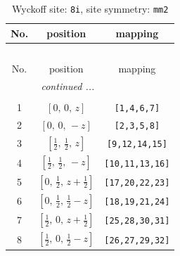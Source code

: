 \documentclass[fleqn,8pt]{jsarticle}
\begin{document}
\begin{longtable}{ccc}
\caption{Wyckoff site: {\tt 8i}, site symmetry: {\tt mm2}}
 \\
 \hline \hline
No. & position & mapping \\ \hline \endfirsthead

\multicolumn{2}{l}{\tablename\ \thetable{}} \\
 \hline \hline
No. & position & mapping \\ \hline \endhead

 \hline \hline
\multicolumn{2}{r}{\footnotesize\it continued ...} \\ \endfoot

 \hline \hline
\multicolumn{2}{r}{} \\ \endlastfoot

1 & $\left[ 0,\, 0,\, z \right]$ & {\tt [1,4,6,7]} \\ \hline
2 & $\left[ 0,\, 0,\, - z \right]$ & {\tt [2,3,5,8]} \\ \hline
3 & $\left[ \frac{1}{2},\, \frac{1}{2},\, z \right]$ & {\tt [9,12,14,15]} \\ \hline
4 & $\left[ \frac{1}{2},\, \frac{1}{2},\, - z \right]$ & {\tt [10,11,13,16]} \\ \hline
5 & $\left[ 0,\, \frac{1}{2},\, z + \frac{1}{2} \right]$ & {\tt [17,20,22,23]} \\ \hline
6 & $\left[ 0,\, \frac{1}{2},\, \frac{1}{2} - z \right]$ & {\tt [18,19,21,24]} \\ \hline
7 & $\left[ \frac{1}{2},\, 0,\, z + \frac{1}{2} \right]$ & {\tt [25,28,30,31]} \\ \hline
8 & $\left[ \frac{1}{2},\, 0,\, \frac{1}{2} - z \right]$ & {\tt [26,27,29,32]} \\
\end{longtable}
\renewcommand{\arraystretch}{1.2}
\end{document}
